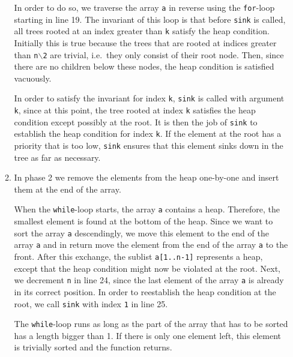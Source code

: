 \begin{enumerate}
\begin{enumerate}
            In order to do so, we traverse the array \texttt{a} in reverse using the
            \texttt{for}-loop starting in line 19.  The invariant of this loop is that before
            \texttt{sink} is called, all trees rooted at an index greater than
            \texttt{k} satisfy the heap condition.  Initially this is true because the trees that
            are rooted at indices greater than \texttt{n$\backslash$2} are trivial, i.e.~they only
            consist of their root node.  Then, since there are no children below these nodes, the heap
            condition is satisfied vacuously. 
            
            In order to satisfy the invariant for index \texttt{k}, \texttt{sink} is called with
            argument \texttt{k},  since at this point, the tree rooted at index \texttt{k} satisfies
            the heap condition except possibly at the root.  It is then the job of \texttt{sink} to
            establish the heap condition for index \texttt{k}.  If the element at the root has a
            priority that is too low, \texttt{sink} ensures that this element sinks down in the tree
            as far as necessary.
      \item In phase 2 we remove the elements from the heap one-by-one and insert them at the end of
            the array.

            When the \texttt{while}-loop starts, the array \texttt{a} contains a heap.  Therefore,
            the smallest element is found at the bottom of the heap.  Since we want to sort the
            array \texttt{a} descendingly, we move this element to the end of the array \texttt{a} and in
            return move the element from the end of the array \texttt{a} to the front.
            After this exchange, the sublist \texttt{a[1..n-1]} represents a heap, except that the
            heap condition might now be violated at the root.  Next, we decrement \texttt{n} in line 24, since the
            last element of the array \texttt{a} is already in its correct position.  
            In order to reestablish the heap condition at the root, we call \texttt{sink} with index
            \texttt{1} in line 25.

            The \texttt{while}-loop runs as long as the part of the array that has to be sorted has
            a length bigger than 1.  If there is only one element left, this element is trivially
            sorted and the function returns.
      \end{enumerate}
\end{enumerate}

